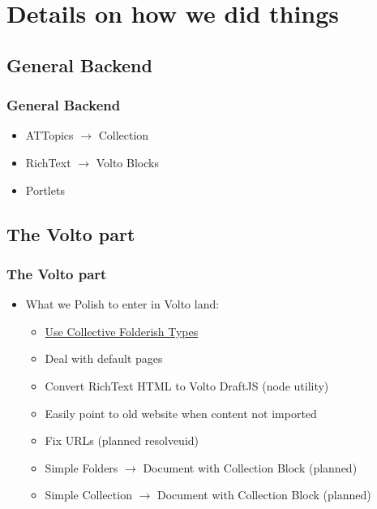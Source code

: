 \documentclass[aspectratio=169]{beamer}
\begin{document}
\section{Details on how we did things}
\subsection{General Backend}
\begin{frame}
  \frametitle{General Backend}
  \begin{itemize}
    \item ATTopics $\rightarrow$ Collection \pause
    \item RichText $\rightarrow$ Volto Blocks \pause
    \item Portlets
  \end{itemize}
\end{frame}

\subsection{The Volto part}
\begin{frame}
  \frametitle{The Volto part}
  \begin{itemize}
    \item What we Polish to enter in Volto land:
    \begin{itemize}
      \item \href{https://github.com/collective/collective.folderishtypes}{Use Collective Folderish Types} \pause
      \item Deal with default pages \pause
      \item Convert RichText HTML to Volto DraftJS (node utility) \pause
      \item Easily point to old website when content not imported \pause
      \item Fix URLs (planned resolveuid) \pause
      \item Simple Folders $\rightarrow$ Document with Collection Block (planned) \pause
      \item Simple Collection $\rightarrow$ Document with Collection Block (planned)
    \end{itemize}
  \end{itemize}
\end{frame}
\end{document}
